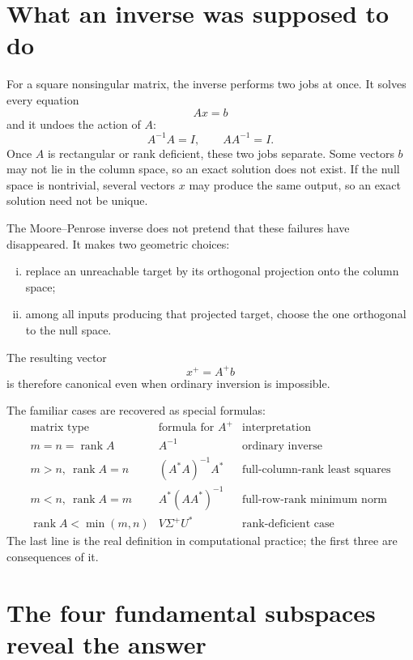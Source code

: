 
\section{What an inverse was supposed to do}

For a square nonsingular matrix, the inverse performs two jobs at once.  It solves every equation
\[
  Ax=b
\]
and it undoes the action of \(A\):
\[
  A^{-1}A=I,
  \qquad
  AA^{-1}=I.
\]
Once \(A\) is rectangular or rank deficient, these two jobs separate.  Some vectors \(b\) may not lie in the column space, so an exact solution does not exist.  If the null space is nontrivial, several vectors \(x\) may produce the same output, so an exact solution need not be unique.

The Moore--Penrose inverse does not pretend that these failures have disappeared.  It makes two geometric choices:

\begin{enumerate}[(i)]
  \item replace an unreachable target by its orthogonal projection onto the column space;
  \item among all inputs producing that projected target, choose the one orthogonal to the null space.
\end{enumerate}

The resulting vector
\[
  x^+=A^+b
\]
is therefore canonical even when ordinary inversion is impossible.

The familiar cases are recovered as special formulas:
\[
\begin{array}{c|c|c}
\text{matrix type} & \text{formula for }A^+ & \text{interpretation}\\
\hline
m=n=\operatorname{rank}A & A^{-1} & \text{ordinary inverse}\\
 m>n,\ \operatorname{rank}A=n
 & (A^*A)^{-1}A^* & \text{full-column-rank least squares}\\
 m<n,\ \operatorname{rank}A=m
 & A^*(AA^*)^{-1} & \text{full-row-rank minimum norm}\\
 \operatorname{rank}A<\min(m,n)
 & V\Sigma^+U^* & \text{rank-deficient case}
\end{array}
\]
The last line is the real definition in computational practice; the first three are consequences of it.

\section{The four fundamental subspaces reveal the answer}

